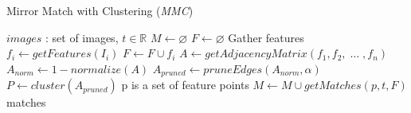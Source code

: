 \documentclass[conference]{IEEEtran}
\begin{document}
%
%

%
\begin{algorithm}
\caption{Mirror Match with Clustering (\emph{MMC})}
\label{alg-mmc}
\begin{algorithmic}
\Require $images$ : set of images, $t \in \mathbb{R}$
\State $M\gets \varnothing$
\State $F\gets \varnothing$
 \Comment Gather features
	\State $f_i\gets getFeatures(I_i)$
	\State $F\gets F \cup f_i$
\EndFor
\State $A\gets getAdjacencyMatrix(f_1, f_2,\; \ldots \;, f_n)$
\State $A_{norm}\gets 1 - normalize(A)$
\State $A_{pruned}\gets pruneEdges(A_{norm},\alpha)$
\State $P\gets cluster(A_{pruned})$
 \Comment p is a set of feature points
	\State $M\gets M \cup getMatches(p, t, F)$
\EndFor \\
\Return matches
\end{algorithmic}
\end{algorithm}
\end{document}
